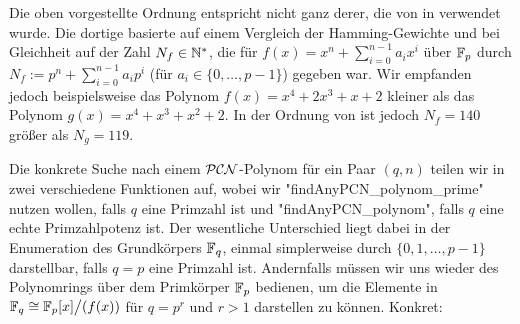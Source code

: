 \begin{bemerkung}
  Die oben vorgestellte Ordnung entspricht nicht ganz derer, die von 
  \citeauthor{morgan1996} in \autocite{morgan1996} verwendet wurde. Die dortige
  basierte auf einem Vergleich der Hamming-Gewichte und bei Gleichheit auf 
  der Zahl $N_f \in \mathbb{N}^\ast$, die für
  $f(x) = x^n+\sum_{i=0}^{n-1} a_ix^i$ über $\mathbb{F}_p$ durch
  $N_f := p^n + \sum_{i=0}^{n-1} a_ip^i$ (für $a_i \in \{0,\ldots,p-1\}$)
  gegeben war. Wir empfanden jedoch beispielsweise das Polynom
  $f(x) = x^4+2x^3+x+2$ kleiner als das Polynom
  $g(x) = x^4+x^3+x^2+2$. In der Ordnung von \citeauthor{morgan1996} ist jedoch
  $N_f = 140$ größer als $N_g = 119$.
\end{bemerkung}


Die konkrete Suche nach einem $\mathcal{PCN}$-Polynom für ein Paar $(q,n)$ 
teilen wir in zwei verschiedene Funktionen auf, wobei wir
"findAnyPCN_polynom_prime" nutzen wollen, falls $q$ eine Primzahl ist und
"findAnyPCN_polynom", falls $q$ eine echte Primzahlpotenz ist. Der wesentliche
Unterschied liegt dabei in der Enumeration des Grundkörpers $\mathbb{F}_q$, einmal
simplerweise durch $\{0,1,\ldots,p-1\}$ darstellbar, falls $q = p$ eine
Primzahl ist. Andernfalls müssen wir uns wieder des Polynomrings
über dem Primkörper $\mathbb{F}_p$ bedienen, um die Elemente in
$\mathbb{F}_q \cong \mathbb{F}_p[x]\big/(f(x))$ für $q=p^r$ und $r>1$ darstellen zu können.
Konkret:

